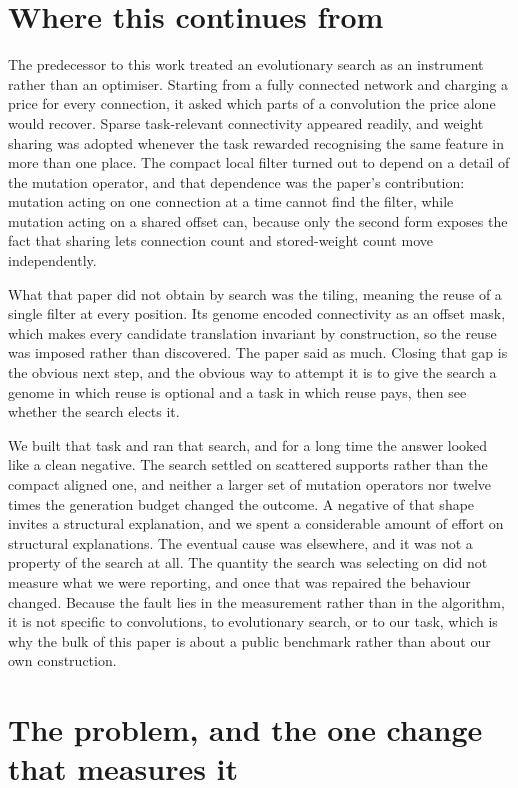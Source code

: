 \documentclass[11pt]{article}
\begin{document}
\section{Where this continues from}

The predecessor to this work \cite{paper1} treated an evolutionary search as an instrument rather than
an optimiser. Starting from a fully connected network and charging a price for every connection, it
asked which parts of a convolution the price alone would recover. Sparse task-relevant connectivity
appeared readily, and weight sharing was adopted whenever the task rewarded recognising the same
feature in more than one place. The compact local filter turned out to depend on a detail of the
mutation operator, and that dependence was the paper's contribution: mutation acting on one connection
at a time cannot find the filter, while mutation acting on a shared offset can, because only the second
form exposes the fact that sharing lets connection count and stored-weight count move independently.

What that paper did not obtain by search was the tiling, meaning the reuse of a single filter at every
position. Its genome encoded connectivity as an offset mask, which makes every candidate translation
invariant by construction, so the reuse was imposed rather than discovered. The paper said as much.
Closing that gap is the obvious next step, and the obvious way to attempt it is to give the search a
genome in which reuse is optional and a task in which reuse pays, then see whether the search elects it.

We built that task and ran that search, and for a long time the answer looked like a clean negative. The
search settled on scattered supports rather than the compact aligned one, and neither a larger set of
mutation operators nor twelve times the generation budget changed the outcome. A negative of that shape
invites a structural explanation, and we spent a considerable amount of effort on structural
explanations. The eventual cause was elsewhere, and it was not a property of the search at all. The
quantity the search was selecting on did not measure what we were reporting, and once that was repaired
the behaviour changed. Because the fault lies in the measurement rather than in the algorithm, it is not
specific to convolutions, to evolutionary search, or to our task, which is why the bulk of this paper is
about a public benchmark rather than about our own construction.

\section{The problem, and the one change that measures it}
\end{document}
